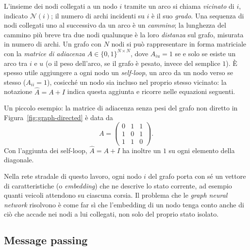 L'insieme dei nodi
collegati a un nodo $i$ tramite un arco si chiama
\emph{vicinato} di $i$, indicato $\mathcal{N}(i)$; il numero di archi
incidenti su $i$ è il suo \emph{grado}. Una sequenza di nodi collegati
uno al successivo da un arco è un \emph{cammino}; la lunghezza del
cammino più breve tra due nodi qualunque è la loro \emph{distanza} sul
grafo, misurata in numero di archi. Un grafo con $N$ nodi si può
rappresentare in forma matriciale con la \emph{matrice di adiacenza} $A
  \in \{0,1\}^{N \times N}$, dove $A_{iu}=1$ se e solo se esiste un arco tra
$i$ e $u$ (o il peso dell'arco, se il grafo è pesato, invece del semplice
$1$). È spesso utile
aggiungere a ogni nodo un \emph{self-loop}, un arco da un nodo verso se
stesso ($A_{ii}=1$), cosicché un nodo sia incluso nel proprio stesso
vicinato: la notazione $\hat A = A + I$ indica questa aggiunta e ricorre
nelle equazioni seguenti.

Un piccolo esempio: la matrice di adiacenza senza pesi del grafo non diretto in Figura~\ref{fig:graph-directed} è data da
\[A = \begin{pmatrix} 0&1&1 \\ 1&0&1 \\ 1&1&0 \end{pmatrix}.\]
Con l'aggiunta dei self-loop, $\hat A = A+I$ ha inoltre un $1$ su ogni elemento della diagonale.

Nella rete stradale di questo lavoro, ogni nodo $i$ del grafo porta con sé
un vettore di caratteristiche (o \emph{embedding}) che ne descrive lo
stato corrente, ad esempio quanti veicoli attendono su ciascuna corsia.
Il problema che le \emph{graph neural network} risolvono è come far sì che l'embedding di un nodo
tenga conto anche di ciò che accade nei nodi a lui collegati, non solo del proprio stato isolato.

\subsection{Message passing}


